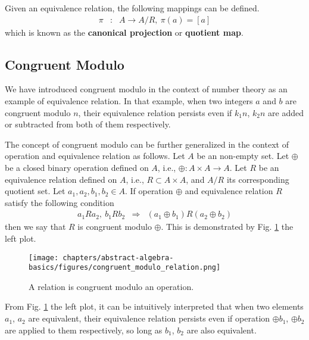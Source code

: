 Given an equivalence relation, the following mappings can be defined.
\begin{eqnarray}
	\pi &:& A \rightarrow A/R, ~\pi(a) = [a] \nonumber
\end{eqnarray}
which is known as the \textbf{canonical projection} or \textbf{quotient map}.

\subsection{Congruent Modulo}

We have introduced congruent modulo in the context of number theory as an example of equivalence relation. In that example, when two integers $a$ and $b$ are congruent modulo $n$, their equivalence relation persists even if $k_1n$, $k_2n$ are added or subtracted from both of them respectively.

The concept of congruent modulo can be further generalized in the context of operation and equivalence relation as follows. Let $A$ be an non-empty set. Let $\oplus$ be a closed binary operation defined on $A$, i.e., $\oplus: A\times A \rightarrow A$. Let $R$ be an equivalence relation defined on $A$, i.e., $R\subset A\times A$, and $A/R$ its corresponding quotient set. Let $a_1, a_2, b_1, b_2 \in A$. If operation $\oplus$ and equivalence relation $R$ satisfy the following condition
\begin{eqnarray}
	a_1Ra_2, ~b_1Rb_2 &\Rightarrow& (a_1\oplus b_1)R(a_2\oplus b_2) \label{eq:relation_congruent_modulo_operation}
\end{eqnarray}
then we say that $R$ is congruent modulo $\oplus$. This is demonstrated by Fig. \ref{fig:congruent_modulo_relation} the left plot.
\begin{figure}[htbp]
	\centering
	\texttt{[image: chapters/abstract-algebra-basics/figures/congruent\_modulo\_relation.png]}
	\caption{A relation is congruent modulo an operation.} \label{fig:congruent_modulo_relation}
\end{figure}
From Fig. \ref{fig:congruent_modulo_relation} the left plot, it can be intuitively interpreted that when two elements $a_1$, $a_2$ are equivalent, their equivalence relation persists even if operation $\oplus b_1$, $\oplus b_2$ are applied to them respectively, so long as $b_1$, $b_2$ are also equivalent.


